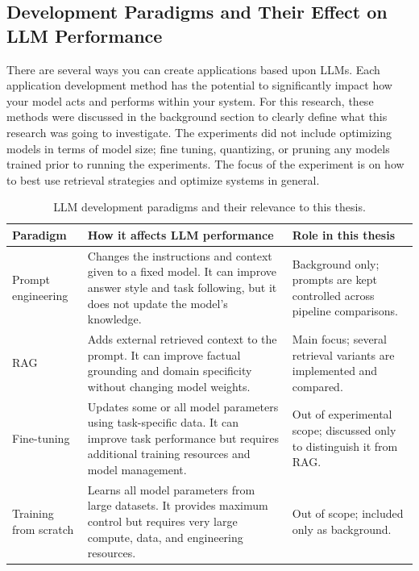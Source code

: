 \subsection{Development Paradigms and Their Effect on LLM Performance}
\label{subsec:llm_paradigms}

There are several ways you can create applications based upon \acp{LLM}. Each application development method has the potential to significantly impact how your model acts and performs within your system. For this research, these methods were discussed in the background section to clearly define what this research was going to investigate. The experiments did not include optimizing models in terms of model size; fine tuning, quantizing, or pruning any models trained prior to running the experiments. The focus of the experiment is on how to best use retrieval strategies and optimize systems in general.

\begin{table}[H]
\caption{LLM development paradigms and their relevance to this thesis.}
\label{tab:llm-development-paradigms}
\centering
\small
\begin{tabularx}{\textwidth}{>{\raggedright\arraybackslash}p{}>{\raggedright\arraybackslash}X>{\raggedright\arraybackslash}p{}}
\toprule
\textbf{Paradigm} & \textbf{How it affects LLM performance} & \textbf{Role in this thesis} \\
\midrule
Prompt engineering & Changes the instructions and context given to a fixed model. It can improve answer style and task following, but it does not update the model's knowledge. & Background only; prompts are kept controlled across pipeline comparisons. \\
\ac{RAG} & Adds external retrieved context to the prompt. It can improve factual grounding and domain specificity without changing model weights. & Main focus; several retrieval variants are implemented and compared. \\
Fine-tuning & Updates some or all model parameters using task-specific data. It can improve task performance but requires additional training resources and model management. & Out of experimental scope; discussed only to distinguish it from \ac{RAG}. \\
Training from scratch & Learns all model parameters from large datasets. It provides maximum control but requires very large compute, data, and engineering resources. & Out of scope; included only as background. \\
\bottomrule
\end{tabularx}
\end{table}

